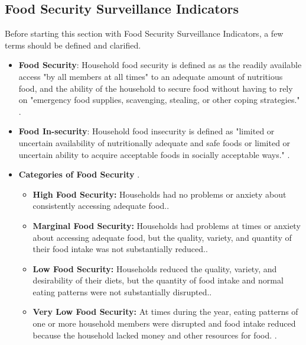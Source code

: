 \documentclass[12pt,letterpaper]{report}
\begin{document}
\subsection{Food Security Surveillance Indicators}

Before starting this section with Food Security Surveillance Indicators, a few terms should be defined and clarified.

\begin{itemize}

\item\textbf{Food Security}: Household food security is defined as as the readily available access "by all members at all times" to an adequate amount of nutritious food, and the ability of the household to secure food without having to rely on "emergency food supplies, scavenging, stealing, or other coping strategies." \cite{anderson1990core}.

\item\textbf{Food In-security}: Household food insecurity is defined as "limited or uncertain availability of nutritionally adequate and safe foods or limited or uncertain ability to acquire acceptable foods in socially acceptable ways." \cite{anderson1990core}.

\item\textbf{Categories of Food Security} \cite{USDAERSFS}.
	\begin{itemize}
		\item \textbf{High Food Security:} Households had no problems or anxiety about consistently accessing adequate food.\cite{USDAERSFS}.
		\item \textbf{Marginal Food Security:} Households had problems at times or anxiety about accessing adequate food, but the quality, variety, and quantity of their food intake was not substantially reduced.\cite{USDAERSFS}.
		\item \textbf{Low Food Security:} Households reduced the quality, variety, and desirability of their diets, but the quantity of food intake and normal eating patterns were not substantially disrupted.\cite{USDAERSFS}.
		\item \textbf{Very Low Food Security:} At times during the year, eating patterns of one or more household members were disrupted and food intake reduced because the household lacked money and other resources for food. \cite{USDAERSFS}.
\end{itemize}


\end{itemize}
\end{document}
